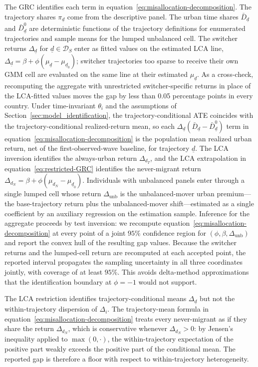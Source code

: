 \documentclass[12pt]{article}
\begin{document}
The GRC identifies each term in equation~\eqref{eq:misallocation-decomposition}.
The trajectory shares $\pi_{\underline{d}}$ come from the descriptive panel.
The urban time shares $\bar{D}_{\underline{d}}$ and $\bar{D}^0_{\underline{d}}$ are deterministic functions of the trajectory definitions for enumerated trajectories and sample means for the lumped unbalanced cell.
The switcher returns $\Delta_{\underline{d}}$ for $\underline{d} \in \mathcal{D}_S$ enter as fitted values on the estimated LCA line, $\Delta_{\underline{d}} = \beta + \phi(\mu_{\underline{d}} - \mu_{\underline{d}_0})$; switcher trajectories too sparse to receive their own GMM cell are evaluated on the same line at their estimated $\mu_{\underline{d}}$.
As a cross-check, recomputing the aggregate with unrestricted switcher-specific returns in place of the LCA-fitted values moves the gap by less than 0.05 percentage points in every country.
Under time-invariant $\theta_i$ and the assumptions of Section~\ref{sec:model_identification}, the trajectory-conditional ATE coincides with the trajectory-conditional realized-return mean, so each $\Delta_{\underline{d}} (\bar{D}_{\underline{d}} - \bar{D}^0_{\underline{d}})$ term in equation~\eqref{eq:misallocation-decomposition} is the population mean realized urban return, net of the first-observed-wave baseline, for trajectory $\underline{d}$.
The LCA inversion identifies the always-urban return $\Delta_{d_T}$, and the LCA extrapolation in equation~\eqref{eq:restricted-GRC} identifies the never-migrant return $\Delta_{d_N} = \beta + \phi(\mu_{d_N} - \mu_{\underline{d}_0})$.
Individuals with unbalanced panels enter through a single lumped cell whose return $\Delta_{\text{unb}}$ is the unbalanced-mover urban premium---the base-trajectory return plus the unbalanced-mover shift---estimated as a single coefficient by an auxiliary regression on the estimation sample.
Inference for the aggregate proceeds by test inversion: we recompute equation~\eqref{eq:misallocation-decomposition} at every point of a joint $95\%$ confidence region for $(\phi, \beta, \Delta_{\text{unb}})$ and report the convex hull of the resulting gap values.
Because the switcher returns and the lumped-cell return are recomputed at each accepted point, the reported interval propagates the sampling uncertainty in all three coordinates jointly, with coverage of at least $95\%$.
This avoids delta-method approximations that the identification boundary at $\phi = -1$ would not support.

The LCA restriction identifies trajectory-conditional means $\Delta_{\underline{d}}$ but not the within-trajectory dispersion of $\Delta_i$.
The trajectory-mean formula in equation~\eqref{eq:misallocation-decomposition} treats every never-migrant as if they share the return $\Delta_{d_N}$, which is conservative whenever $\Delta_{d_N} > 0$: by Jensen's inequality applied to $\max(0, \cdot)$, the within-trajectory expectation of the positive part weakly exceeds the positive part of the conditional mean.
The reported gap is therefore a floor with respect to within-trajectory heterogeneity.
\end{document}
